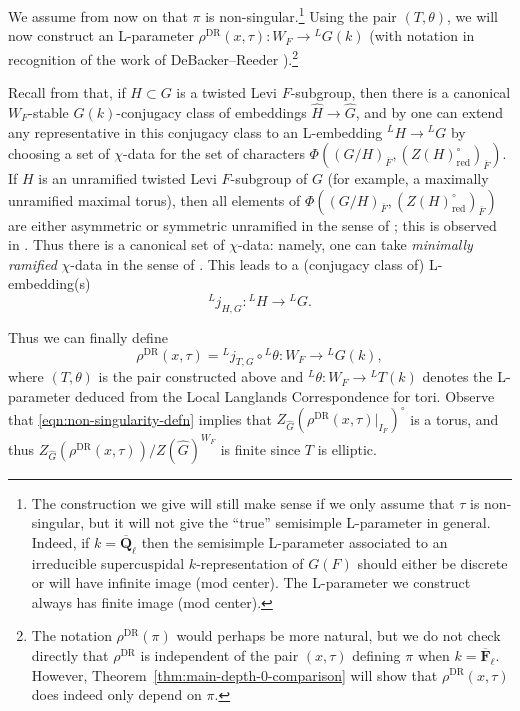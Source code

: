 \documentclass[reqno]{amsart}
\numberwithin{equation}{subsection}
\newcommand{\F}{\mathbf{F}}
\newcommand{\Q}{\mathbf{Q}}
\newcommand{\ol}[1]{\overline{#1}}
\newcommand{\wh}[1]{\widehat{#1}}
\newcommand{\co}{\colon}
\newcommand{\ld}{{}^L}
\DeclareMathOperator{\red}{red}
\DeclareMathOperator{\DR}{DR}
\theoremstyle{remark}
\numberwithin{equation}{subsection}
\numberwithin{figure}{subsection}
\begin{document}
We assume from now on that $\pi$ is non-singular.\footnote{The construction we give will still make sense if we only assume that $\tau$ is non-singular, but it will not give the ``true'' semisimple L-parameter in general. Indeed, if $k = \ol\Q_\ell$ then the semisimple L-parameter associated to an irreducible supercuspidal $k$-representation of $G(F)$ should either be discrete or will have infinite image (mod center). The L-parameter we construct always has finite image (mod center).} Using the pair $(T, \theta)$, we will now construct an L-parameter $\rho^{\DR}(x,\tau)\co W_F \to \ld G(k)$ (with notation in recognition of the work of DeBacker--Reeder \cite{DR09}).\footnote{The notation $\rho^{\DR}(\pi)$ would perhaps be more natural, but we do not check directly that $\rho^{\DR}$ is independent of the pair $(x, \tau)$ defining $\pi$ when $k = \ol\F_\ell$. However, Theorem~\ref{thm:main-depth-0-comparison} will show that $\rho^{\DR}(x, \tau)$ does indeed only depend on $\pi$.}

Recall from \cite[\S 6]{Kal21a} that, if $H \subset G$ is a twisted Levi $F$-subgroup, then there is a canonical $W_F$-stable $\wh G(k)$-conjugacy class of embeddings $\wh H \to \wh G$, and by \cite[Remark 6.8]{Kal21a} one can extend any representative in this conjugacy class to an L-embedding $\ld H \to \ld G$ by choosing a set of $\chi$-data for the set of characters $\Phi((G/H)_{\ol F}, (Z(H)^\circ_{\red})_{\ol F})$. If $H$ is an unramified twisted Levi $F$-subgroup of $G$ (for example, a maximally unramified maximal torus), then all elements of $\Phi((G/H)_{\ol F}, (Z(H)^\circ_{\red})_{\ol F})$ are either asymmetric or symmetric unramified in the sense of \cite[\S 2]{Kal21a}; this is observed in \cite[Lemma~3.2.1]{CF26a}. Thus there is a canonical set of $\chi$-data: namely, one can take \emph{minimally ramified} $\chi$-data in the sense of \cite[Definition 4.6.1]{Kal19}. This leads to a (conjugacy class of) L-embedding(s)
\[
\ld j_{H,G}\co \ld H \to \ld G.
\]

Thus we can finally define
\[
\rho^{\DR}(x,\tau) = \ld j_{T,G} \circ \ld\theta\co W_F \to \ld G(k),
\]
where $(T, \theta)$ is the pair constructed above and $\ld\theta\co W_F \to \ld T(k)$ denotes the L-parameter deduced from the Local Langlands Correspondence for tori. Observe that \eqref{eqn:non-singularity-defn} implies that $Z_{\wh G}(\rho^{\DR}(x, \tau)|_{I_F})^\circ$ is a torus, and thus $Z_{\wh G}(\rho^{\DR}(x, \tau))/Z(\wh G)^{W_F}$ is finite since $T$ is elliptic.
\end{document}
